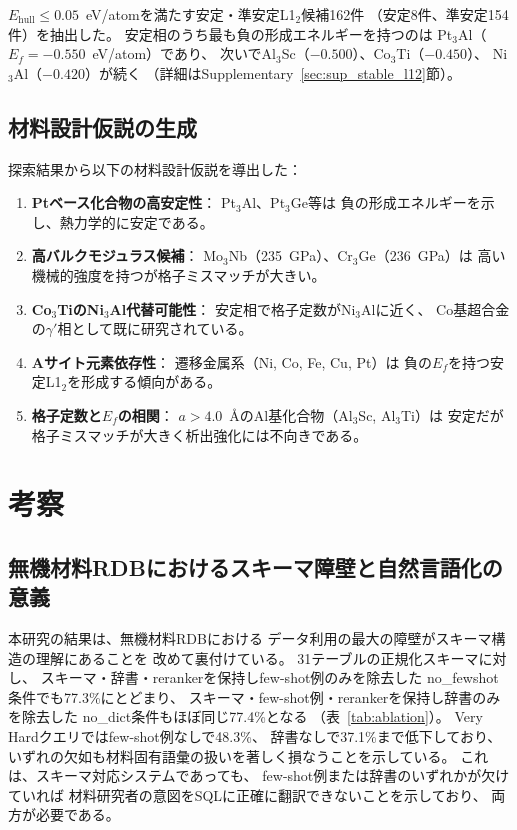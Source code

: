 \documentclass[5p,twocolumn]{elsarticle}
\begin{document}
$E_\text{hull} \leq 0.05$~eV/atomを満たす安定・準安定L1$_2$候補162件
（安定8件、準安定154件）を抽出した。
安定相のうち最も負の形成エネルギーを持つのは
Pt$_3$Al（$E_f = -0.550$~eV/atom）であり、
次いでAl$_3$Sc（$-0.500$）、Co$_3$Ti（$-0.450$）、
Ni$_3$Al（$-0.420$）が続く
（詳細はSupplementary~\ref{sec:sup_stable_l12}節）。

\subsection{材料設計仮説の生成}

探索結果から以下の材料設計仮説を導出した：

\begin{enumerate}
  \item \textbf{Ptベース化合物の高安定性}：
    Pt$_3$Al、Pt$_3$Ge等は
    負の形成エネルギーを示し、熱力学的に安定である。
  \item \textbf{高バルクモジュラス候補}：
    Mo$_3$Nb（235~GPa）、Cr$_3$Ge（236~GPa）は
    高い機械的強度を持つが格子ミスマッチが大きい。
  \item \textbf{Co$_3$TiのNi$_3$Al代替可能性}：
    安定相で格子定数がNi$_3$Alに近く、
    Co基超合金の$\gamma'$相として既に研究されている。
  \item \textbf{Aサイト元素依存性}：
    遷移金属系（Ni, Co, Fe, Cu, Pt）は
    負の$E_f$を持つ安定L1$_2$を形成する傾向がある。
  \item \textbf{格子定数と$E_f$の相関}：
    $a > 4.0$~\AA のAl基化合物（Al$_3$Sc, Al$_3$Ti）は
    安定だが格子ミスマッチが大きく析出強化には不向きである。
\end{enumerate}

\section{考察}
\label{sec:discussion}

\subsection{無機材料RDBにおけるスキーマ障壁と自然言語化の意義}

本研究の結果は、無機材料RDBにおける
データ利用の最大の障壁がスキーマ構造の理解にあることを
改めて裏付けている。
31テーブルの正規化スキーマに対し、
スキーマ・辞書・rerankerを保持しfew-shot例のみを除去した
no\_fewshot条件でも77.3\%にとどまり、
スキーマ・few-shot例・rerankerを保持し辞書のみを除去した
no\_dict条件もほぼ同じ77.4\%となる
（表~\ref{tab:ablation}）。
Very Hardクエリではfew-shot例なしで48.3\%、
辞書なしで37.1\%まで低下しており、
いずれの欠如も材料固有語彙の扱いを著しく損なうことを示している。
これは、スキーマ対応システムであっても、
few-shot例または辞書のいずれかが欠けていれば
材料研究者の意図をSQLに正確に翻訳できないことを示しており、
両方が必要である。
\end{document}
